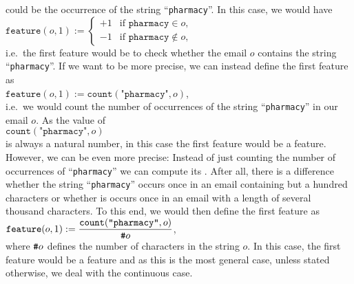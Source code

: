 could be the occurrence of the string ``\texttt{pharmacy}''.  In this case, we would have
\\[0.2cm]
\hspace*{1.3cm}
$\texttt{feature}(o, 1) := \left\{
\begin{array}{ll}
  +1 & \mbox{if \ $\texttt{pharmacy}     \in o$,}      \\
  -1 & \mbox{if \ $\texttt{pharmacy} \not\in o$,}  
\end{array}\right.
$
\\[0.2cm]
i.e.~the first feature would be to check whether the email $o$ contains the string ``\texttt{pharmacy}''.  
If we want to be more precise, we can instead define the first feature as
\\[0.2cm]
\hspace*{1.3cm}
$\texttt{feature}(o, 1) := \mathtt{count}(\texttt{"pharmacy"}, o)$,
\\[0.2cm]
i.e.~we would count the number of occurrences of the string ``\texttt{pharmacy}'' in our email $o$.   
As the value of
\\[0.2cm]
\hspace*{1.3cm}
 $\mathtt{count}(\texttt{"pharmacy"}, o)$ 
\\[0.2cm]
is always a natural number, in this case the first feature would be a
  feature.  However, we can be even more precise: Instead of just counting the number of occurrences of
 ``\texttt{pharmacy}'' we can compute its .  After all, there is a difference whether the
 string ``\texttt{pharmacy}'' occurs once in an email  containing but a hundred characters or whether is occurs
 once in an email with a length of several thousand  characters.  To this end, we would then define the first feature as
\\[0.2cm]
\hspace*{1.3cm}
$\displaystyle \texttt{feature}(o, 1) := \frac{\mathtt{count}(\texttt{"pharmacy"}, o)}{\texttt{\#} o}$, 
\\[0.2cm]
where $\texttt{\#} o$ defines the number of characters in the string $o$.  In this case, the first feature would be a
 feature and as this is the most general case, unless stated otherwise, we deal with the continuous
case. 

